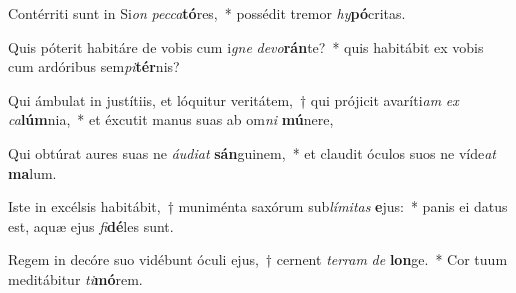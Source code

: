 \item Contérriti sunt in Si\textit{on} \textit{pec}\textit{ca}\textbf{tó}res,~* possédit tremor \textit{hy}\textbf{pó}critas.
\item Quis póterit habitáre de vobis cum i\textit{gne} \textit{de}\textit{vo}\textbf{rán}te?~* quis habitábit ex vobis cum ardóribus sem\textit{pi}\textbf{tér}nis?
\item Qui ámbulat in justítiis, et lóquitur veritátem,~† qui prójicit avaríti\textit{am} \textit{ex} \textit{ca}\textbf{lúm}nia,~* et éxcutit manus suas ab om\textit{ni} \textbf{mú}nere,
\item Qui obtúrat aures suas ne \textit{áu}\textit{di}\textit{at} \textbf{sán}guinem,~* et claudit óculos suos ne víde\textit{at} \textbf{ma}lum.
\item Iste in excélsis habitábit,~† muniménta saxórum sub\textit{lí}\textit{mi}\textit{tas} \textbf{e}jus:~* panis ei datus est, aquæ ejus \textit{fi}\textbf{dé}les sunt.
\item Regem in decóre suo vidébunt óculi ejus,~† cernent \textit{ter}\textit{ram} \textit{de} \textbf{lon}ge.~* Cor tuum meditábitur \textit{ti}\textbf{mó}rem.
